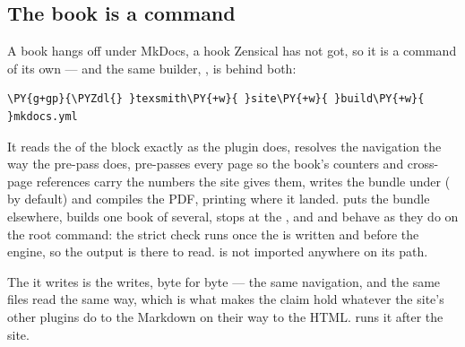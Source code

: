 \documentclass[a4paper,twoside]{article}
\begin{document}
\subsection{The book is a command}
\label{the-book-is-a-command}
A book hangs off  under MkDocs, a hook Zensical has not got, so
it is a command of its own --- and the same builder, , is
behind both:
\begin{tscode}[lang=console, engine=pygments]
\begin{Verbatim}[commandchars=\\\{\},breaklines, breakanywhere, commandchars=\\\{\}]
\PY{g+gp}{\PYZdl{} }texsmith\PY{+w}{ }site\PY{+w}{ }build\PY{+w}{ }mkdocs.yml
\end{Verbatim}
\end{tscode}
It reads the  of the  block exactly as the plugin does,
resolves the navigation the way the pre-pass does, pre-passes every page so the
book's counters and cross-page references carry the numbers the site gives
them, writes the bundle under  ( by default) and compiles
the PDF, printing where it landed.  puts the bundle elsewhere,
 builds one book of several,  stops at the , and
 and  behave as they do on the root command: the
strict check runs once the  is written and before the engine, so the
output is there to read.  is not imported anywhere on its path.

The  it writes is the   writes, byte
for byte --- the same navigation, and the same files read the same way, which is
what makes the claim hold whatever the site's other plugins do to the Markdown
on their way to the HTML.  runs it after the site.
\end{document}

